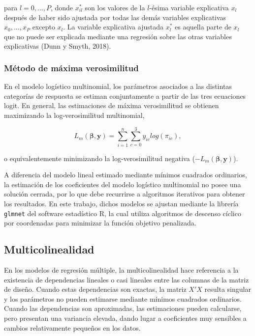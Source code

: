 \documentclass[
  12pt,
]{article}
\begin{document}
para \(l= 0,...,P\), donde \(x_{il}^*\) son los valores de la
\(l\)-ésima variable explicativa \(x_l\) después de haber sido ajustada
por todas las demás variables explicativas \(x_0,...,x_P\) excepto
\(x_l\). La variable explicativa ajustada \(x_{l}^*\) es aquella parte
de \(x_l\) que no puede ser explicada mediante una regresión sobre las
otras variables explicativas (Dunn y Smyth, 2018).

\subsubsection{Método de máxima
verosimilitud}\label{muxe9todo-de-muxe1xima-verosimilitud}

En el modelo logístico multinomial, los parámetros asociados a las
distintas categorías de respuesta se estiman conjuntamente a partir de
las tres ecuaciones logit. En general, las estimaciones de máxima
verosimilitud se obtienen maximizando la log-verosimilitud multinomial,

\begin{equation}
L_m(\boldsymbol{\beta},\boldsymbol{y})=\sum_{i=1}^n\sum_{c=0}^3y_{ic}log(\pi_{ic}),
\end{equation}

o equivalentemente minimizando la log-verosimilitud negativa
(\(-L_m(\boldsymbol{\beta},\boldsymbol{y})\)).

A diferencia del modelo lineal estimado mediante mínimos cuadrados
ordinarios, la estimación de los coeficientes del modelo logístico
multinomial no posee una solución cerrada, por lo que debe recurrirse a
algoritmos iterativos para obtener los resultados. En este trabajo,
dichos modelos se ajustan mediante la librería \texttt{glmnet} del
software estadístico R, la cual utiliza algoritmos de descenso cíclico
por coordenadas para minimizar la función objetivo penalizada.

\subsection{Multicolinealidad}\label{multicolinealidad}

En los modelos de regresión múltiple, la multicolinealidad hace
referencia a la existencia de dependencias lineales o casi lineales
entre las columnas de la matriz de diseño. Cuando estas dependencias son
exactas, la matriz \(X'X\) resulta singular y los parámetros no pueden
estimarse mediante mínimos cuadrados ordinarios. Cuando las dependencias
son aproximadas, las estimaciones pueden calcularse, pero presentan una
variancia elevada, dando lugar a coeficientes muy sensibles a cambios
relativamente pequeños en los datos.
\end{document}
